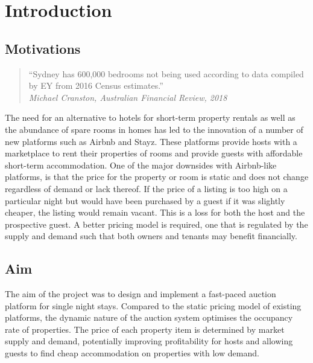 \section{Introduction}

\subsection{Motivations}

\smallskip
\begin{quote}
  ``Sydney has 600,000 bedrooms not being used according to data
  compiled by EY from 2016 Census estimates.'' \\
  \hspace*{\fill}\emph{Michael Cranston, Australian Financial Review, 2018}
\end{quote}

The need for an alternative to hotels for short-term property rentals as well
as the abundance of spare rooms in homes has led to the innovation of
a number of new platforms such as Airbnb and Stayz.
These platforms provide hosts with a marketplace to rent their properties of rooms and
provide guests with affordable short-term accommodation. One of the major downsides
with Airbnb-like platforms, is that
the price for the property or room is static and does not change regardless
of demand or lack thereof. If the price of a listing is too high on a particular night
but would have been purchased by a guest if it was slightly cheaper, the listing would
remain vacant. This is a loss for both the host and the prospective guest. A better
pricing model is required, one that is regulated by the supply and demand such that
both owners and tenants may benefit financially.

\subsection{Aim}

The aim of the project was to design and implement a fast-paced auction
platform for single night stays. Compared to the static pricing
model of existing platforms, the dynamic nature of the auction system
optimises the occupancy rate of properties. The price of each property item is
determined by market supply and demand, potentially improving profitability for
hosts and allowing guests to find cheap accommodation on properties with low demand.


